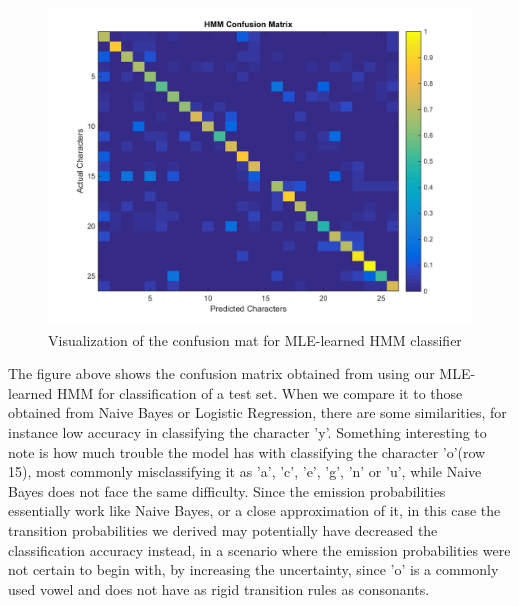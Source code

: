\documentclass{article} %
\begin{document}
\begin{figure}[h]
\begin{center}
\includegraphics[scale=0.3]{confusion_hmm.png}
\end{center}
\caption{Visualization of the confusion mat for MLE-learned HMM classifier}
\end{figure}

The figure above shows the confusion matrix obtained from using our MLE-learned HMM for classification of a test set. When we compare it to those obtained from Naive Bayes or Logistic Regression, there are some similarities, for instance low accuracy in classifying the character 'y'. Something interesting to note is how much trouble the model has with classifying the character 'o'(row 15), most commonly misclassifying it as 'a', 'c', 'e', 'g', 'n' or 'u', while Naive Bayes does not face the same difficulty. Since the emission probabilities essentially work like Naive Bayes, or a close approximation of it, in this case the transition probabilities we derived may potentially have decreased the classification accuracy instead, in a scenario where the emission probabilities were not certain to begin with, by increasing the uncertainty, since 'o' is a commonly used vowel and does not have as rigid transition rules as consonants.
\end{document}
